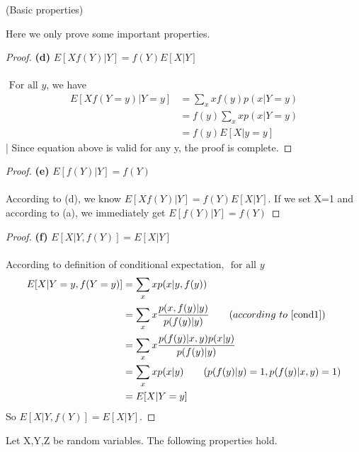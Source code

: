 \begin{enumerate}
\begin{lemma}{(Basic properties)}
\begin{enumerate}
            \end{enumerate}

          \end{lemma}
          Here we only prove some important properties.
          \begin{proof}{\textbf{(d)} $E[Xf(Y)|Y] = f(Y)E[X|Y]$}
            \\ \\ $\text{ For all } y$, we have
            \begin{align*}
              E[Xf(Y=y)|Y=y] & = \sum_{x}xf(y)p(x|Y=y) \\
                             & = f(y)\sum_{x}xp(x|Y=y) \\
                             & = f(y)E[X|y=y]
            \end{align*}
            | Since equation above is valid for any y, the proof is complete.
          \end{proof}
          \begin{proof}{\textbf{(e)} $E[f(Y)|Y] = f(Y)$}
            \\ \\According to (d), we know $E[Xf(Y)|Y] = f(Y)E[X|Y]$. If we set X=1 and according to (a), we immediately get
            $E[f(Y)|Y] = f(Y)$
          \end{proof}
          \begin{proof}{\textbf{(f)} $E[X|Y,f(Y)] = E[X|Y]$}
            \\ \\According to definition of conditional expectation, $\text{ for all } y$
            \begin{align*}
              E[X|Y=y,f(Y=y)] & = \sum_{x}xp(x|y,f(y))                                                       \\
                              & =\sum_{x}x \frac{p(x,f(y)|y)}{p(f(y)|y)} \qquad (according\ to\ \ref{cond1}) \\
                              & =\sum_{x}x \frac{p(f(y)|x,y)p(x|y)}{p(f(y)|y)}                               \\
                              & =\sum_{x}xp(x|y) \qquad (p(f(y)|y)=1, p(f(y)|x,y)=1)                         \\
                              & = E[X|Y=y]
            \end{align*}
            So $E[X|Y,f(Y)] = E[X|Y]$.
          \end{proof}

          \begin{lemma}{Let X,Y,Z be random variables. The following properties hold.}
            \begin{enumerate}


\end{enumerate}
\end{lemma}
\end{enumerate}
